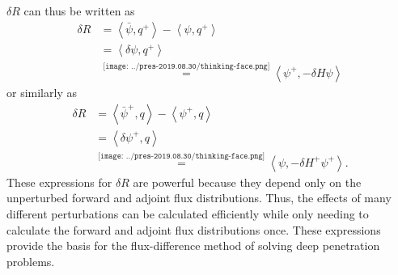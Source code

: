 $\delta R$ can thus be written as
\begin{equation}\label{eq:bg:pt:green170a}\begin{split}
  \delta R & = \left<\bar{\psi},q^+\right> - \left<\psi,q^+\right> \\
           & = \left<\delta\psi,q^+\right> \\
           & \stackrel{\texttt{[image: ../pres-2019.08.30/thinking-face.png]}}{=} \left<\psi^+,-\delta H\psi\right>
\end{split}\end{equation}
or similarly as
\begin{equation}\label{eq:bg:pt:green170b}\begin{split}
  \delta R & = \left<\bar{\psi}^+,q\right> - \left<\psi^+,q\right> \\
           & = \left<\delta\psi^+,q\right> \\
           & \stackrel{\texttt{[image: ../pres-2019.08.30/thinking-face.png]}}{=} \left<\psi,-\delta H^+\psi^+\right>.
\end{split}\end{equation}
These expressions for $\delta R$ are powerful because they depend only on the unperturbed forward and adjoint flux distributions.
Thus, the effects of many different perturbations can be calculated efficiently while only needing to calculate the forward and adjoint flux distributions once.
These expressions provide the basis for the flux-difference method of solving deep penetration problems.
